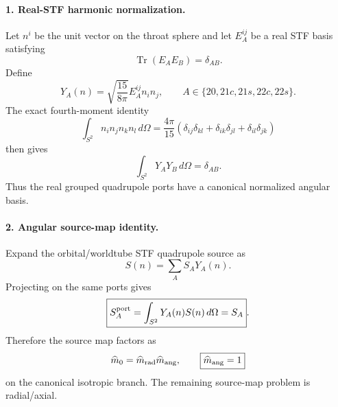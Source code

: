 \paragraph{1. Real-STF harmonic normalization.}
Let \(n^i\) be the unit vector on the throat sphere and let \(E_A^{ij}\) be a real STF basis satisfying
\begin{equation}
\label{eq:app-stage024-STF-norm}
\operatorname{Tr}(E_AE_B)=\delta_{AB}.
\end{equation}
Define
\begin{equation}
\label{eq:app-stage024-YA}
Y_A(n)=\sqrt{\frac{15}{8\pi}}E_A^{ij}n_in_j,
\qquad
A\in\{20,21c,21s,22c,22s\}.
\end{equation}
The exact fourth-moment identity
\begin{equation}
\label{eq:app-stage024-fourth-moment}
\int_{S^2}n_in_jn_kn_l\,d\Omega
=\frac{4\pi}{15}\left(\delta_{ij}\delta_{kl}+\delta_{ik}\delta_{jl}+\delta_{il}\delta_{jk}\right)
\end{equation}
then gives
\begin{equation}
\label{eq:app-stage024-Y-orthonormal}
\boxed{
\int_{S^2}Y_A Y_B\,d\Omega=\delta_{AB}}.
\end{equation}
Thus the real grouped quadrupole ports have a canonical normalized angular basis.

\paragraph{2. Angular source-map identity.}
Expand the orbital/worldtube STF quadrupole source as
\begin{equation}
\label{eq:app-stage024-source-expansion}
S(n)=\sum_A S_A Y_A(n).
\end{equation}
Projecting on the same ports gives
\begin{equation}
\label{eq:app-stage024-source-map}
\boxed{
S_A^{\rm port}=\int_{S^2}Y_A(n)S(n)\,d\Omega=S_A}.
\end{equation}
Therefore the source map factors as
\begin{equation}
\label{eq:app-stage024-mhat-factor}
\widehat m_0=\widehat m_{\rm rad}\widehat m_{\rm ang},
\qquad
\boxed{\widehat m_{\rm ang}=1}
\end{equation}
on the canonical isotropic branch.  The remaining source-map problem is radial/axial.

